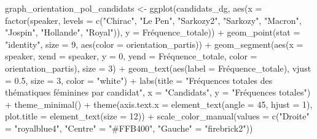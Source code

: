 \documentclass[
  letterpaper,
  DIV=11,
  numbers=noendperiod]{scrartcl}
\newenvironment{Shaded}{\begin{snugshade}}{\end{snugshade}}
\newcommand{\AttributeTok}[1]{\textcolor[rgb]{0.40,0.45,0.13}{#1}}
\newcommand{\DecValTok}[1]{\textcolor[rgb]{0.68,0.00,0.00}{#1}}
\newcommand{\FloatTok}[1]{\textcolor[rgb]{0.68,0.00,0.00}{#1}}
\newcommand{\FunctionTok}[1]{\textcolor[rgb]{0.28,0.35,0.67}{#1}}
\newcommand{\NormalTok}[1]{\textcolor[rgb]{0.00,0.23,0.31}{#1}}
\newcommand{\OtherTok}[1]{\textcolor[rgb]{0.00,0.23,0.31}{#1}}
\newcommand{\SpecialCharTok}[1]{\textcolor[rgb]{0.37,0.37,0.37}{#1}}
\newcommand{\StringTok}[1]{\textcolor[rgb]{0.13,0.47,0.30}{#1}}
\begin{document}
\begin{Shaded}
\begin{Highlighting}[]
\NormalTok{graph\_orientation\_pol\_candidats }\OtherTok{\textless{}{-}} \FunctionTok{ggplot}\NormalTok{(candidats\_dg, }\FunctionTok{aes}\NormalTok{(}\AttributeTok{x =} \FunctionTok{factor}\NormalTok{(speaker, }\AttributeTok{levels =} \FunctionTok{c}\NormalTok{(}\StringTok{"Chirac"}\NormalTok{, }\StringTok{"Le Pen"}\NormalTok{, }\StringTok{"Sarkozy2"}\NormalTok{, }\StringTok{"Sarkozy"}\NormalTok{,  }\StringTok{"Macron"}\NormalTok{, }\StringTok{"Jospin"}\NormalTok{, }\StringTok{"Hollande"}\NormalTok{, }\StringTok{"Royal"}\NormalTok{)), }\AttributeTok{y =}\NormalTok{ Fréquence\_totale)) }\SpecialCharTok{+} \FunctionTok{geom\_point}\NormalTok{(}\AttributeTok{stat =} \StringTok{"identity"}\NormalTok{, }\AttributeTok{size =} \DecValTok{9}\NormalTok{, }\FunctionTok{aes}\NormalTok{(}\AttributeTok{color =}\NormalTok{ orientation\_partis)) }\SpecialCharTok{+} \FunctionTok{geom\_segment}\NormalTok{(}\FunctionTok{aes}\NormalTok{(}\AttributeTok{x =}\NormalTok{ speaker, }\AttributeTok{xend =}\NormalTok{ speaker, }\AttributeTok{y =} \DecValTok{0}\NormalTok{, }\AttributeTok{yend =}\NormalTok{ Fréquence\_totale, }\AttributeTok{color =}\NormalTok{ orientation\_partis), }\AttributeTok{size =} \DecValTok{3}\NormalTok{) }\SpecialCharTok{+} \FunctionTok{geom\_text}\NormalTok{(}\FunctionTok{aes}\NormalTok{(}\AttributeTok{label =}\NormalTok{ Fréquence\_totale), }\AttributeTok{vjust =} \FloatTok{0.5}\NormalTok{, }\AttributeTok{size =} \DecValTok{3}\NormalTok{, }\AttributeTok{color =} \StringTok{"white"}\NormalTok{) }\SpecialCharTok{+}  \FunctionTok{labs}\NormalTok{(}\AttributeTok{title =} \StringTok{"Fréquences totales des thématiques féminines par candidat"}\NormalTok{, }\AttributeTok{x =} \StringTok{"Candidats"}\NormalTok{, }\AttributeTok{y =} \StringTok{"Fréquences totales"}\NormalTok{) }\SpecialCharTok{+} \FunctionTok{theme\_minimal}\NormalTok{() }\SpecialCharTok{+} \FunctionTok{theme}\NormalTok{(}\AttributeTok{axis.text.x =} \FunctionTok{element\_text}\NormalTok{(}\AttributeTok{angle =} \DecValTok{45}\NormalTok{, }\AttributeTok{hjust =} \DecValTok{1}\NormalTok{), }\AttributeTok{plot.title =} \FunctionTok{element\_text}\NormalTok{(}\AttributeTok{size =} \DecValTok{12}\NormalTok{)) }\SpecialCharTok{+} \FunctionTok{scale\_color\_manual}\NormalTok{(}\AttributeTok{values =} \FunctionTok{c}\NormalTok{(}\StringTok{"Droite"} \OtherTok{=} \StringTok{"royalblue4"}\NormalTok{, }\StringTok{"Centre"} \OtherTok{=} \StringTok{"\#FFB400"}\NormalTok{, }\StringTok{"Gauche"} \OtherTok{=} \StringTok{"firebrick2"}\NormalTok{))}
\end{Highlighting}
\end{Shaded}
\end{document}
